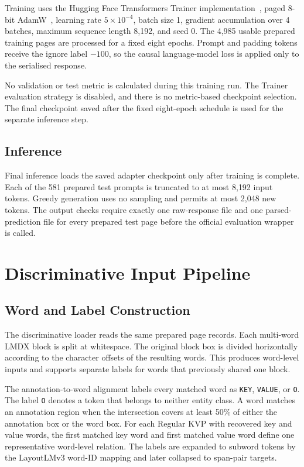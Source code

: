 Training uses the Hugging Face Transformers Trainer
implementation~\cite{wolf2020transformers}, paged 8-bit
AdamW~\cite{bitsandbytes}, learning rate
$5\times10^{-4}$, batch size 1, gradient accumulation over 4 batches, maximum
sequence length 8{,}192, and seed 0. The 4{,}985 usable prepared training pages
are processed for a fixed eight epochs. Prompt and padding tokens receive the
ignore label $-100$, so the causal language-model loss is applied only to the
serialised response.

No validation or test metric is calculated during this training run. The
Trainer evaluation strategy is disabled, and there is no metric-based
checkpoint selection. The final checkpoint saved after the fixed eight-epoch
schedule is used for the separate inference step.

\subsection{Inference}
\label{sec:mistral-inference}

Final inference loads the saved adapter checkpoint only after training is
complete. Each of the 581 prepared test prompts is truncated to at most 8{,}192
input tokens. Greedy generation uses no sampling and permits at most 2{,}048
new tokens. The output checks require exactly one raw-response file and one
parsed-prediction file for every prepared test page before the official
evaluation wrapper is called.

\section{Discriminative Input Pipeline}
\label{sec:layout-encoding}

\subsection{Word and Label Construction}
\label{sec:data-loader}

The discriminative loader reads the same prepared page records. Each
multi-word LMDX block is split at whitespace. The original block box is divided
horizontally according to the character offsets of the resulting words. This
produces word-level inputs and supports separate labels for words that
previously shared one block.

The annotation-to-word alignment labels every matched word as
\texttt{KEY}, \texttt{VALUE}, or \texttt{O}. The label \texttt{O} denotes a
token that belongs to neither entity class. A word matches an annotation region
when the intersection covers at least 50\% of either the annotation box or the
word box. For each Regular KVP with recovered key and value words, the first
matched key word and first matched value word define one representative
word-level relation. The labels are expanded to subword tokens by the
LayoutLMv3 word-ID mapping and later collapsed to span-pair targets.

